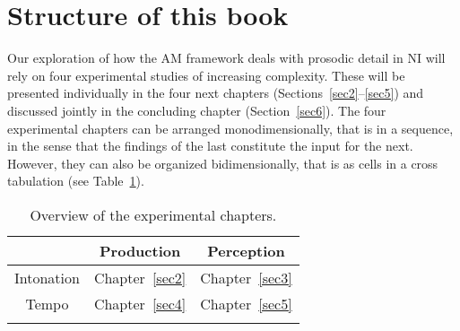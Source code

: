 \section{Structure of this book}\label{sec13}
Our exploration of how the AM framework deals with prosodic detail in NI will rely on four experimental studies of increasing complexity. These will be presented individually in the four next chapters (Sections~\ref{sec2}--\ref{sec5}) and discussed jointly in the concluding chapter (Section~\ref{sec6}). The four experimental chapters can be arranged monodimensionally, that is in a sequence, in the sense that the findings of the last constitute the input for the next. However, they can also be organized bidimensionally, that is as cells in a cross tabulation (see Table~\ref{tab11}).

\begin{table}[h]
\centering
\begin{tabular}{c c c}
\mytoprule
& Production & Perception\\
\midrule
Intonation & Chapter~\ref{sec2} & Chapter~\ref{sec3}\\
Tempo & Chapter~\ref{sec4} & Chapter~\ref{sec5}\\
\mybottomrule
\end{tabular}
\caption{Overview of the experimental chapters.}
\label{tab11}\end{table}

